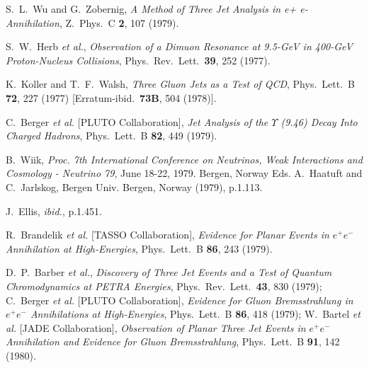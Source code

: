 \documentclass{ws-rv975x65}[12pt]
\begin{document}
\begin{thebibliography}{9}
S.~L.~Wu and G.~Zobernig,
{\it A Method of Three Jet Analysis in e+ e- Annihilation},
  Z.\ Phys.\ C {\bf 2}, 107 (1979).

S.~W.~Herb {\it et al.},
{\it Observation of a Dimuon Resonance at 9.5-GeV in 400-GeV Proton-Nucleus Collisions},
  Phys.\ Rev.\ Lett.\  {\bf 39}, 252 (1977).

K.~Koller and T.~F.~Walsh,
{\it Three Gluon Jets as a Test of QCD},
  Phys.\ Lett.\ B {\bf 72}, 227 (1977)
  [Erratum-ibid.\  {\bf 73B}, 504 (1978)].

C.~Berger {\it et al.}  [PLUTO Collaboration],
{\it Jet Analysis of the $\Upsilon$ (9.46) Decay Into Charged Hadrons},
  Phys.\ Lett.\ B {\bf 82}, 449 (1979).

B.~Wiik,
{\it Proc. 7th International Conference on Neutrinos, Weak Interactions and Cosmology - Neutrino 79}, June 18-22, 1979. Bergen, Norway 
Eds. A.~Haatuft and C.~Jarlskog, Bergen Univ. Bergen, Norway (1979), p.1.113.

J.~Ellis, {\it ibid.}, p.1.451.

R.~Brandelik {\it et al.}  [TASSO Collaboration],
{\it Evidence for Planar Events in $e^+ e^-$ Annihilation at High-Energies},
  Phys.\ Lett.\ B {\bf 86}, 243 (1979).

D.~P.~Barber {\it et al.},
{\it Discovery of Three Jet Events and a Test of Quantum Chromodynamics at PETRA Energies},
  Phys.\ Rev.\ Lett.\  {\bf 43}, 830 (1979);
C.~Berger {\it et al.}  [PLUTO Collaboration],
{\it Evidence for Gluon Bremsstrahlung in $e^+ e^-$ Annihilations at High-Energies},
  Phys.\ Lett.\ B {\bf 86}, 418 (1979);
  W.~Bartel {\it et al.}  [JADE Collaboration],
{\it Observation of Planar Three Jet Events in $e^+ e^-$ Annihilation and Evidence for Gluon Bremsstrahlung},
  Phys.\ Lett.\ B {\bf 91}, 142 (1980).
  

\end{thebibliography}
\end{document}
